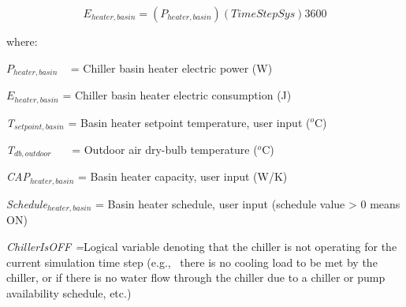 \begin{equation}
{E_{heater,basin}} = \left( {{P_{heater,basin}}} \right)\left( {TimeStepSys} \right)3600
\end{equation}

where:

\({P_{heater,basin}}\) ~ = Chiller basin heater electric power (W)

\({E_{heater,basin}}\) = Chiller basin heater electric consumption (J)

\emph{T\(_{setpoint,basin}\)} = Basin heater setpoint temperature, user input (\(^{o}\)C)

\emph{T\(_{db,outdoor}\)}~~~ = Outdoor air dry-bulb temperature (\(^{o}\)C)

\emph{CAP\(_{heater,basin}\)} = Basin heater capacity, user input (W/K)

\emph{Schedule\(_{heater,basin}\)} = Basin heater schedule, user input (schedule value \textgreater{} 0 means ON)

\emph{ChillerIsOFF =}Logical variable denoting that the chiller is not operating for the current simulation time step (e.g.,~ there is no cooling load to be met by the chiller, or if there is no water flow through the chiller due to a chiller or pump availability schedule, etc.) 
